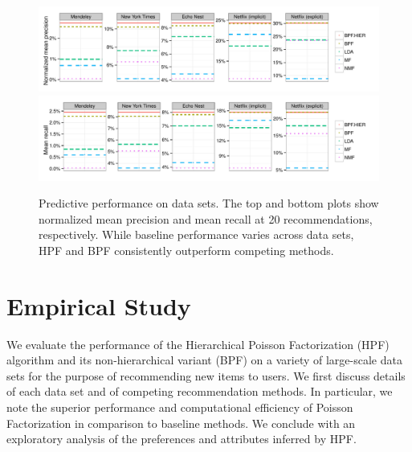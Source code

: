 \begin{figure}[t!]
\centering
\includegraphics[width=\textwidth]{figures/mean_precision_at_20.pdf}\\
\includegraphics[width=\textwidth]{figures/mean_recall_at_20.pdf}\\
\caption{Predictive performance on data sets. The top and bottom plots
  show normalized mean precision and mean recall at 20
  recommendations, respectively. While baseline performance varies
  across data sets, HPF and BPF consistently outperform competing
  methods.}
\label{fig:precision_recall}
\end{figure}


\section{Empirical Study}
We evaluate the performance of the Hierarchical Poisson Factorization
(HPF) algorithm and its non-hierarchical variant (BPF) on a variety of
large-scale data sets for the purpose of recommending new items to
users. We first discuss details of each data set and of competing
recommendation methods. In particular, we note the superior
performance and computational efficiency of Poisson Factorization in
comparison to baseline methods. We conclude with an exploratory
analysis of the preferences and attributes inferred by HPF.

